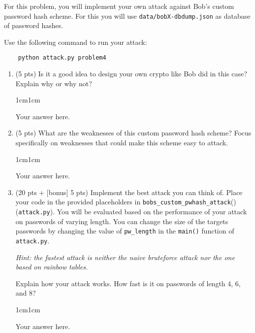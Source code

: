 \documentclass[11pt,letterpaper]{article}
\newenvironment{answer}{\em \color{blue} \begin{adjustwidth}{1cm}{1cm}}{\end{adjustwidth}}
\begin{document}
For this problem, you will implement your own attack against Bob's custom password hash scheme. For this you will use \texttt{data/bobX-dbdump.json} as database of password hashes.

Use the following command to run your attack:
%
\begin{Verbatim}
	python attack.py problem4
\end{Verbatim}
%


%
\begin{enumerate}
		\item (5 pts) Is it a good idea to design your own crypto like Bob did in this case? Explain why or why not?
	
	\begin{answer}
	
		Your answer here.
		
	\end{answer}
	
	\item (5 pts) What are the weaknesses of this custom password hash scheme? Focus specifically on weaknesses that could make this scheme easy to attack.
	
	\begin{answer}
	
		Your answer here.
		
	\end{answer}


	\item (20 pts + [bonus] 5 pts) Implement the best attack you can think of. Place your code in the provided placeholders in \texttt{bobs\_custom\_pwhash\_attack}() (\texttt{attack.py}). You will be evaluated based on the performance of your attack on passwords of varying length. You can change the size of the targets passwords by changing the value of \texttt{pw\_length} in the \texttt{main()} function of \texttt{attack.py}.
	
	{\em Hint: the fastest attack is neither the naive bruteforce attack nor the one based on rainbow tables.}
	
	Explain how your attack works. How fast is it on passwords of length 4, 6, and 8?
	
	\begin{answer}
	
		Your answer here.
		
	\end{answer}

\end{enumerate}
\end{document}
